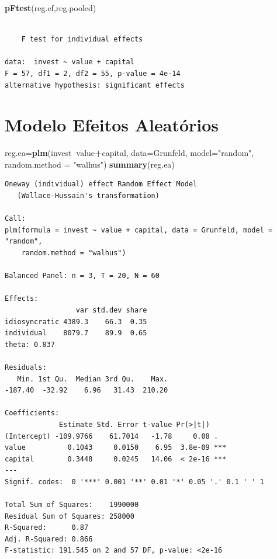 \documentclass[12pt,brazil,oneside]{book}
\newenvironment{Shaded}{\begin{snugshade}}{\end{snugshade}}
\newcommand{\DataTypeTok}[1]{\textcolor[rgb]{0.13,0.29,0.53}{#1}}
\newcommand{\KeywordTok}[1]{\textcolor[rgb]{0.13,0.29,0.53}{\textbf{#1}}}
\newcommand{\NormalTok}[1]{#1}
\newcommand{\OperatorTok}[1]{\textcolor[rgb]{0.81,0.36,0.00}{\textbf{#1}}}
\newcommand{\StringTok}[1]{\textcolor[rgb]{0.31,0.60,0.02}{#1}}
\begin{document}
\begin{Shaded}
\begin{Highlighting}[]
\KeywordTok{pFtest}\NormalTok{(reg.ef,reg.pooled)}
\end{Highlighting}
\end{Shaded}

\begin{verbatim}

    F test for individual effects

data:  invest ~ value + capital
F = 57, df1 = 2, df2 = 55, p-value = 4e-14
alternative hypothesis: significant effects
\end{verbatim}

\hypertarget{modelo-efeitos-aleatorios}{%
\section{Modelo Efeitos Aleatórios}\label{modelo-efeitos-aleatorios}}

\begin{Shaded}
\begin{Highlighting}[]
\NormalTok{reg.ea=}\KeywordTok{plm}\NormalTok{(invest}\OperatorTok{~}\NormalTok{value}\OperatorTok{+}\NormalTok{capital,}
           \DataTypeTok{data=}\NormalTok{Grunfeld, }\DataTypeTok{model=}\StringTok{"random"}\NormalTok{, }
           \DataTypeTok{random.method =} \StringTok{"walhus"}\NormalTok{)}
\KeywordTok{summary}\NormalTok{(reg.ea)}
\end{Highlighting}
\end{Shaded}

\begin{verbatim}
Oneway (individual) effect Random Effect Model 
   (Wallace-Hussain's transformation)

Call:
plm(formula = invest ~ value + capital, data = Grunfeld, model = "random", 
    random.method = "walhus")

Balanced Panel: n = 3, T = 20, N = 60

Effects:
                 var std.dev share
idiosyncratic 4389.3    66.3  0.35
individual    8079.7    89.9  0.65
theta: 0.837

Residuals:
   Min. 1st Qu.  Median 3rd Qu.    Max. 
-187.40  -32.92    6.96   31.43  210.20 

Coefficients:
             Estimate Std. Error t-value Pr(>|t|)    
(Intercept) -109.9766    61.7014   -1.78     0.08 .  
value          0.1043     0.0150    6.95  3.8e-09 ***
capital        0.3448     0.0245   14.06  < 2e-16 ***
---
Signif. codes:  0 '***' 0.001 '**' 0.01 '*' 0.05 '.' 0.1 ' ' 1

Total Sum of Squares:    1990000
Residual Sum of Squares: 258000
R-Squared:      0.87
Adj. R-Squared: 0.866
F-statistic: 191.545 on 2 and 57 DF, p-value: <2e-16
\end{verbatim}
\end{document}
